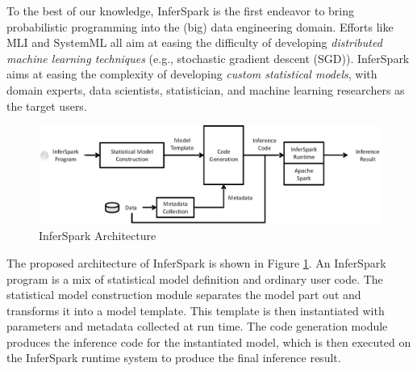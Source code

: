 \documentclass[a4paper,12pt,oneside,onecolumn,final]{book}
\newcommand{\figref}[1]{Figure \ref{#1}}
\begin{document}

To the best of our knowledge, InferSpark is the first endeavor to bring 
probabilistic programming into the (big) data engineering domain.
Efforts like MLI \cite{mli} and SystemML \cite{systemml} all aim 
at easing the difficulty of developing \emph{distributed machine learning techniques} 
(e.g., stochastic gradient descent (SGD)).
InferSpark aims at easing the complexity of developing 
\emph{custom statistical models}, 
with domain experts, data scientists, statistician, and 
machine learning researchers as the target users.

\begin{figure}[th]
	\centering
	\includegraphics[width=0.7\columnwidth]{figs/workflow3.eps}
	\caption{InferSpark Architecture}
	\label{fig:workflow}
\end{figure}


The proposed architecture of InferSpark is shown in \figref{fig:workflow}. An
InferSpark program is a mix of statistical model definition and ordinary user
code. The statistical model construction module separates the model part out
and transforms it into a model template. This template is then instantiated
with parameters and metadata collected at run time. The code generation module
produces the inference code for the instantiated model, which is then executed
on the InferSpark runtime system to produce the final inference result.
\end{document}
